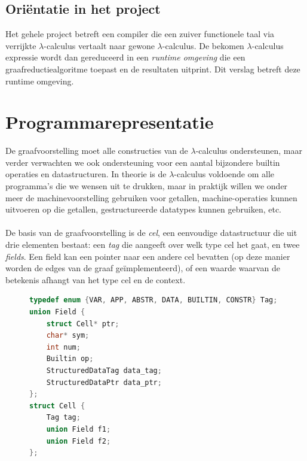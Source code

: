 \documentclass[a4paper,10pt]{article}
\begin{document}
\subsection{Ori{\"e}ntatie in het project}
Het gehele project betreft een compiler die een zuiver functionele taal via verrijkte $\lambda$-calculus vertaalt naar gewone $\lambda$-calculus.
De bekomen $\lambda$-calculus expressie wordt dan gereduceerd in een \emph{runtime omgeving} die een graafreductiealgoritme toepast en de resultaten uitprint.
Dit verslag betreft deze runtime omgeving.

\section{Programmarepresentatie}
De graafvoorstelling moet alle constructies van de $\lambda$-calculus ondersteunen, maar verder verwachten we ook ondersteuning voor een aantal bijzondere builtin operaties en datastructuren.
In theorie is de $\lambda$-calculus voldoende om alle programma's die we wensen uit te drukken, maar in praktijk willen we onder meer de machinevoorstelling gebruiken voor getallen, machine-operaties kunnen uitvoeren op die getallen, gestructureerde datatypes kunnen gebruiken, etc.
\paragraph{}
De basis van de graafvoorstelling is de \emph{cel}, een eenvoudige datastructuur die uit drie elementen bestaat: een \emph{tag} die aangeeft over welk type cel het gaat, en twee \emph{fields}.
Een field kan een pointer naar een andere cel bevatten (op deze manier worden de edges van de graaf ge{\"i}mplementeerd), of een waarde waarvan de betekenis afhangt van het type cel en de context.

\begin{figure}[h]
    \begin{lstlisting}[language=C,frame=single,caption={Definitie van de Cell datastructuur}]
typedef enum {VAR, APP, ABSTR, DATA, BUILTIN, CONSTR} Tag;
union Field {
	struct Cell* ptr;
	char* sym;
	int num;
	Builtin op;
	StructuredDataTag data_tag;
	StructuredDataPtr data_ptr;
};
struct Cell {
	Tag tag;
	union Field f1;
	union Field f2;
};
\end{lstlisting}
\end{figure}
\end{document}
